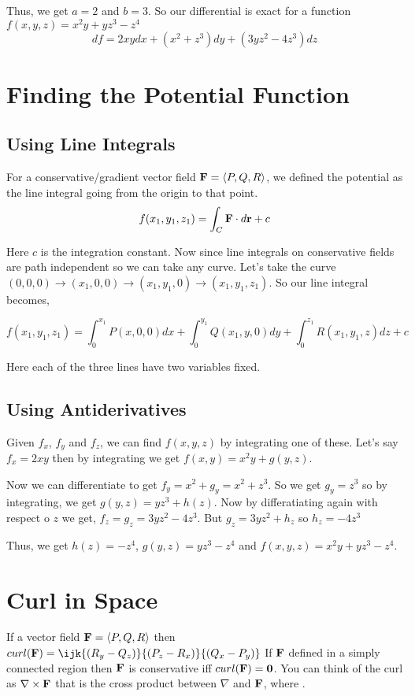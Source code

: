 Thus, we get $a = 2$ and $b = 3$.
So our differential is exact for a function $f(x, y, z) = x^2 y + yz^3 - z^4$
$$ df = 2xy dx + (x^2 + z^3) dy + (3yz^2 - 4z^3) dz $$


\section{Finding the Potential Function}

\subsection{Using Line Integrals}

For a conservative/gradient vector field ${\bf F} = \left< P, Q, R \right>$, 
we defined the potential as the line integral going from the origin to that point.
$$ f(x_1, y_1, z_1) = \int_C {\bf F} \cdot d{\bf r} + c $$

Here $c$ is the integration constant.
Now since line integrals on conservative fields are path independent so we can take any curve.
Let's take the curve $(0, 0, 0) \to (x_1, 0, 0) \to (x_1, y_1, 0) \to (x_1, y_1, z_1)$.
So our line integral becomes, 

$$ f(x_1, y_1, z_1) = \int_0^{x_1} P(x, 0, 0) dx + \int_0^{y_1} Q(x_1, y, 0) dy + \int_0^{z_1} R(x_1, y_1, z) dz + c$$

Here each of the three lines have two variables fixed.

\subsection{Using Antiderivatives}

Given $f_x$, $f_y$ and $f_z$, we can find $f(x, y, z)$ by integrating one of these.
Let's say $f_x = 2xy$ then by integrating we get $f(x, y) = x^2 y + g(y, z)$.

Now we can differentiate to get $f_y = x^2 + g_y = x^2 + z^3$.
So we get $g_y = z^3$ so by integrating, we get $g(y, z) = yz^3 + h(z)$.
Now by differatiating again with respect o $z$ we get,
$f_z = g_z = 3yz^2 - 4z^3$.
But $g_z = 3yz^2 + h_z$ so $h_z = -4z^3$

Thus, we get $h(z) = -z^4$, $g(y, z) = yz^3 - z^4$ and $f(x, y, z) = x^2 y + yz^3 - z^4$.

\section{Curl in Space}

If a vector field ${\bf F} = \left< P, Q, R \right>$ then
$curl({\bf F}) = \ijk{(R_y - Q_z)}{(P_z - R_x)}{(Q_x - P_y)}$
If ${\bf F}$ defined in a simply connected region then ${\bf F}$ is conservative iff $curl({\bf F}) = {\bf 0}$.
You can think of the curl as $\nabla \times {\bf F}$ that is the cross product between $\nabla$ and ${\bf F}$,
where .

